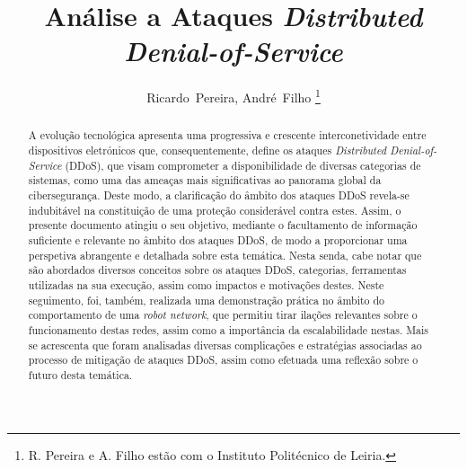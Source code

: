 \documentclass[journal]{IEEEtran}
\begin{document}
%
\title{Análise a Ataques \textit{Distributed Denial-of-Service}}

\author{Ricardo~Pereira,
  André~Filho%
  \thanks{R. Pereira e A. Filho estão com o Instituto Politécnico de Leiria.}}%

\maketitle

\renewcommand{\abstractname}{Resumo} %
\begin{abstract}
  A evolução tecnológica apresenta uma progressiva e crescente interconetividade entre dispositivos eletrónicos que, consequentemente, define os ataques \textit{Distributed Denial-of-Service} (DDoS), que visam comprometer a disponibilidade de diversas categorias de sistemas, como uma das ameaças mais significativas ao panorama global da cibersegurança. Deste modo, a clarificação do âmbito dos ataques DDoS revela-se indubitável na constituição de uma proteção considerável contra estes. Assim, o presente documento atingiu o seu objetivo, mediante o facultamento de informação suficiente e relevante no âmbito dos ataques DDoS, de modo a proporcionar uma perspetiva abrangente e detalhada sobre esta temática. Nesta senda, cabe notar que são abordados diversos conceitos sobre os ataques DDoS, categorias, ferramentas utilizadas na sua execução, assim como impactos e motivações destes. Neste seguimento, foi, também, realizada uma demonstração prática no âmbito do comportamento de uma \textit{robot network}, que permitiu tirar ilações relevantes sobre o funcionamento destas redes, assim como a importância da escalabilidade nestas. Mais se acrescenta que foram analisadas diversas complicações e estratégias associadas ao processo de mitigação de ataques DDoS, assim como efetuada uma reflexão sobre o futuro desta temática.
\end{abstract}
\end{document}
